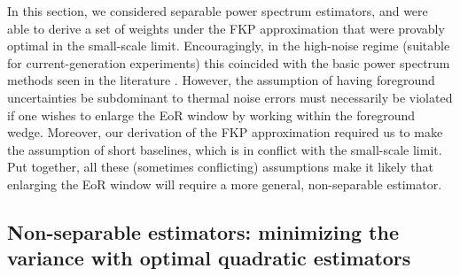 \documentclass[twocolumn,aps,prd,nofootinbib,showpacs]{revtex4-1}
\begin{document}
In this section, we considered separable power spectrum estimators, and were able to derive a set of weights under the FKP approximation that were provably optimal in the small-scale limit.  Encouragingly, in the high-noise regime (suitable for current-generation experiments) this coincided with the basic power spectrum methods seen in the literature \cite{Bernardi2013,Thyagarajan2013,Hazelton2013}.  However, the assumption of having foreground uncertainties be subdominant to thermal noise errors must necessarily be violated if one wishes to enlarge the EoR window by working within the foreground wedge.  Moreover, our derivation of the FKP approximation required us to make the assumption of short baselines, which is in conflict with the small-scale limit.  Put together, all these (sometimes conflicting) assumptions make it likely that enlarging the EoR window will require a more general, non-separable estimator.

%
%

\subsection{Non-separable estimators: minimizing the variance with optimal quadratic estimators}
\label{sec:BetterEst}
\end{document}
